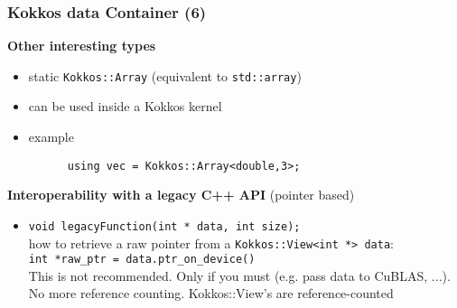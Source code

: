 \begin{frame}[fragile=singleslide]
  \frametitle{Kokkos data Container (6)}

  {\Large \bf Other interesting types}
  \begin{itemize}
  \item static \texttt{Kokkos::Array} (equivalent to \texttt{std::array})
  \item can be used inside a Kokkos kernel
  \item example
    \begin{verbatim}
      using vec = Kokkos::Array<double,3>;
    \end{verbatim}
  \end{itemize}

  {\Large \bf Interoperability with a legacy C++ API} (pointer based)

  \begin{itemize}
  \item \texttt{void legacyFunction(int * data, int size);}\\
    how to retrieve a raw pointer from a \texttt{Kokkos::View<int *> data}:\\
    \texttt{int *raw\_ptr = data.ptr\_on\_device()} \\
    This is not recommended. Only if you must (e.g. pass data to CuBLAS, ...).\\
    No more reference counting. Kokkos::View's are reference-counted
  \end{itemize}

\end{frame}

